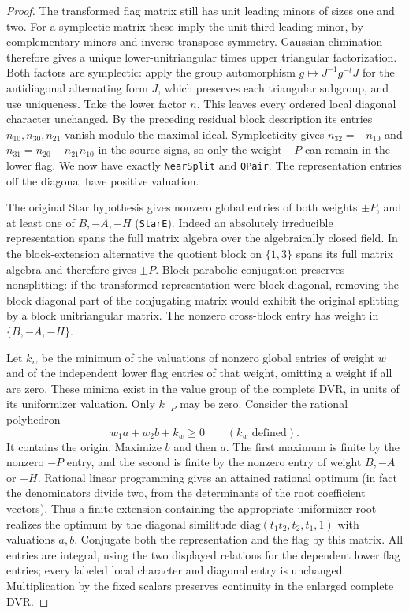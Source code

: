 \begin{proof}
The transformed flag matrix still has unit leading minors
of sizes one and two. For a symplectic matrix these imply
the unit third leading minor, by complementary minors
and inverse-transpose symmetry. Gaussian elimination
therefore gives a unique lower-unitriangular times upper
triangular factorization. Both factors are symplectic:
apply the group automorphism $g\mapsto J^{-1}g^{-t}J$
for the antidiagonal alternating form $J$, which preserves
each triangular subgroup, and use uniqueness.
Take the lower factor $n$. This leaves every ordered
local diagonal character unchanged. By the preceding
residual block description its entries $n_{10},n_{30},
n_{21}$ vanish modulo the maximal ideal. Symplecticity
gives $n_{32}=-n_{10}$ and
$n_{31}=n_{20}-n_{21}n_{10}$ in the source signs,
so only the weight $-P$ can remain in the lower flag.
We now have exactly \texttt{NearSplit} and \texttt{QPair}.
The representation entries off the diagonal have positive
valuation.

The original $\mathrm{Star}$ hypothesis gives nonzero
global entries of both weights $\pm P$, and at least one
of $B,-A,-H$ (\texttt{StarE}). Indeed an absolutely
irreducible representation spans the full matrix algebra
over the algebraically closed field. In the block-extension
alternative the quotient block on $\{1,3\}$ spans its full
matrix algebra and therefore gives $\pm P$. Block parabolic
conjugation preserves nonsplitting: if the transformed
representation were block diagonal, removing the block
diagonal part of the conjugating matrix would exhibit the
original splitting by a block unitriangular matrix.
The nonzero cross-block entry has weight in $\{B,-A,-H\}$.

Let $k_w$ be the minimum of the valuations of nonzero
global entries of weight $w$ and of the independent lower
flag entries of that weight, omitting a weight if all are
zero. These minima exist in the value group of the
complete DVR, in units of its uniformizer valuation.
Only $k_{-P}$ may be zero. Consider the rational polyhedron
\[
              w_1 a+w_2 b+k_w\ge0
                       \qquad(k_w\text{ defined}).
\]
It contains the origin. Maximize $b$ and then $a$.
The first maximum is finite by the nonzero $-P$ entry,
and the second is finite by the nonzero entry of weight
$B,-A$ or $-H$. Rational linear programming gives an
attained rational optimum (in fact the denominators divide
two, from the determinants of the root coefficient
vectors). Thus a finite extension containing the appropriate
uniformizer root realizes the optimum by the diagonal
similitude $\mathrm{diag}(t_1t_2,t_2,t_1,1)$ with
valuations $a,b$. Conjugate both the representation and
the flag by this matrix. All entries are integral, using
the two displayed relations for the dependent lower
flag entries; every labeled local character and diagonal
entry is unchanged. Multiplication by the fixed scalars
preserves continuity in the enlarged complete DVR.


\end{proof}
